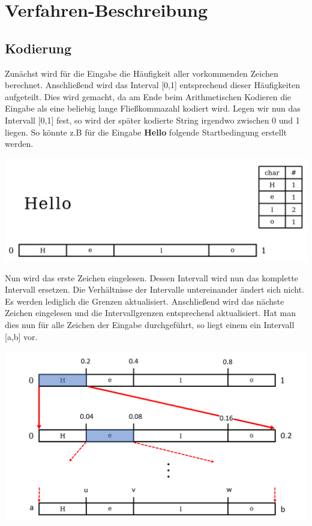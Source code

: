 \documentclass[a4paper]{article}
\theoremstyle{definition}
\theoremstyle{remark}
\begin{document}
		\section{Verfahren-Beschreibung}
		\subsection{Kodierung}
		\label{sec:Verfahren-Kodierung}
Zunächst wird für die Eingabe die Häufigkeit aller vorkommenden Zeichen berechnet. Anschließend wird das Interval [0,1] entsprechend dieser Häufigkeiten aufgeteilt. Dies wird gemacht, da am Ende  beim Arithmetischen Kodieren die Eingabe als eine beliebig lange Fließkommazahl kodiert wird. Legen wir nun das Intervall [0,1] fest, so wird der später kodierte String irgendwo zwischen 0 und 1 liegen.
So könnte z.B für die Eingabe \textbf{Hello} folgende Startbedingung erstellt werden.
\begin{center}
\includegraphics[scale=0.4]{enc-schritt1}
\end{center}
\newpage
Nun wird das erste Zeichen eingelesen. Dessen Intervall wird nun das komplette Intervall ersetzen. Die Verhältnisse der Intervalle untereinander ändert sich nicht. Es werden lediglich die Grenzen aktualisiert. Anschließend wird das nächste Zeichen eingelesen und die Intervallgrenzen entsprechend aktualisiert. Hat man dies nun für alle Zeichen der Eingabe durchgeführt, so liegt einem ein Intervall [a,b] vor.
\begin{center}
\includegraphics[scale=0.5]{enc-schritt2}
\end{center}
\end{document}
